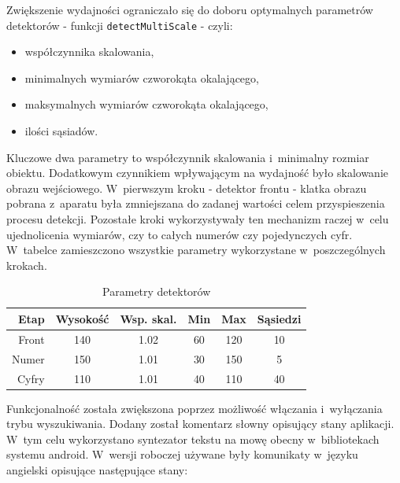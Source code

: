 Zwiększenie wydajności ograniczało się do doboru optymalnych parametrów
detektorów - funkcji \verb|detectMultiScale| - czyli:

\begin{itemize}
    \item współczynnika skalowania,
    \item minimalnych wymiarów czworokąta okalającego,
    \item maksymalnych wymiarów czworokąta okalającego,
    \item ilości sąsiadów.
\end{itemize}

Kluczowe dwa parametry to współczynnik skalowania i~minimalny rozmiar
obiektu. Dodatkowym czynnikiem wpływającym na wydajność było
skalowanie obrazu wejściowego. W~pierwszym kroku - detektor frontu -
klatka obrazu pobrana z~aparatu była zmniejszana do zadanej wartości
celem przyspieszenia procesu detekcji. Pozostałe kroki wykorzystywały
ten mechanizm raczej w~celu ujednolicenia wymiarów, czy to całych 
numerów czy pojedynczych cyfr. W~tabelce zamieszczono wszystkie 
parametry wykorzystane w~poszczególnych krokach.

\begin{table}[!h]
    \centering
    \begin{tabular}{r c c c c c }
        Etap    & Wysokość  & Wsp. skal.    & Min   & Max   & Sąsiedzi \\ \hline
        Front   & 140       & 1.02          & 60    & 120   & 10 \\
        Numer   & 150       & 1.01          & 30    & 150   & 5 \\
        Cyfry   & 110       & 1.01          & 40    & 110   & 40
    \end{tabular}
    \caption{Parametry detektorów}
    \label{tab:imp_det_params}
\end{table}

Funkcjonalność została zwiększona poprzez możliwość włączania i~wyłączania
trybu wyszukiwania. Dodany został komentarz słowny opisujący stany 
aplikacji. W~tym celu wykorzystano syntezator tekstu na mowę
obecny w~bibliotekach systemu android. W~wersji roboczej używane
były komunikaty w~języku angielski opisujące następujące stany:

